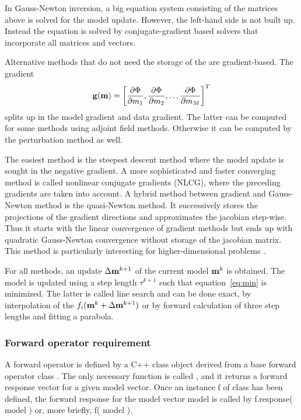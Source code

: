 In Gauss-Newton inversion, a big equation system consisting of the matrices above is solved for the model update.
However, the left-hand side is not built up. 
Instead the equation is solved by conjugate-gradient based solvers that incorporate all matrices and vectors.

Alternative methods that do not need the storage of the are gradient-based.
The gradient 
\[ \mathbf{g}(\mathbf{m}) = \left[ \frac{\partial \Phi}{\partial m_1}, \frac{\partial \Phi}{\partial m_2}, \ldots \frac{\partial \Phi}{\partial m_M} \right]^T \]
splits up in the model gradient and data gradient.
The latter can be computed for some methods using adjoint field methods.
Otherwise it can be computed by the perturbation method as well.

The easiest method is the steepest descent method where the model update is sought in the negative gradient.
A more sophisticated and faster converging method is called nonlinear conjugate gradients (NLCG), where the preceding gradients are taken into account.
A hybrid method between gradient and Gauss-Newton method is the quasi-Newton method.
It successively stores the projections of the gradient directions and approximates the jacobian step-wise.
Thus it starts with the linear convergence of gradient methods but ends up with quadratic Gauss-Newton convergence without storage of the jacobian matrix.
This method is particularly interesting for higher-dimensional problems \citep{haber05}.

For all methods, an update $\Delta\mathbf{m}^{k+1}$ of the current model $\mathbf{m}^k$ is obtained.
The model is updated using a step length  $\tau^{k+1}$ such that equation~\ref{eq:min} is minimized.
The latter is called line search and can be done exact, by interpolation of the $f_i(\mathbf{m}^k+\Delta\mathbf{m}^{k+1})$ or by forward calculation of three step lengths and fitting a parabola.

\subsubsection*{Forward operator requirement}\label{sec:forward}
A forward operator is defined by a C++ class object derived from a base forward operator class .
The only necessary function is called , and it returns a forward response vector for a given model vector.
Once an instance f of class has been defined, the forward response for the model vector model is called by f.response( model ) or, more briefly, f( model ).

